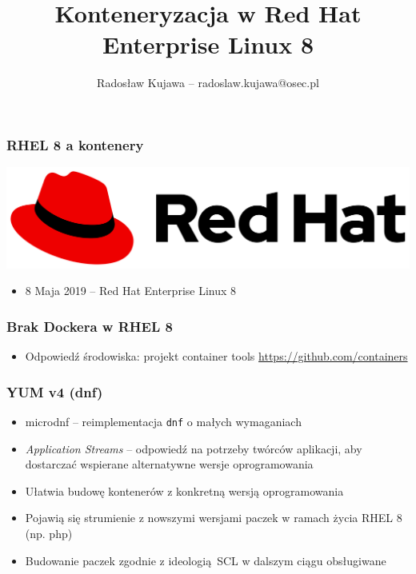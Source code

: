 \documentclass[dvipsnames,table]{beamer}
\title{Konteneryzacja w Red Hat Enterprise Linux 8}
\author{Radosław Kujawa -- radoslaw.kujawa@osec.pl}
\institute{OSEC}
\begin{document}
\begin{frame}
	\titlepage
\end{frame}

\begin{frame}
\frametitle{RHEL 8 a kontenery}
\begin{center}
\includegraphics[scale=0.1]{img-rhlogo.png}
\end{center}
\begin{itemize}
	\item 8 Maja 2019 -- Red Hat Enterprise Linux 8
\end{itemize}
\begin{center}
\end{center}
\end{frame}

\begin{frame}
	\frametitle{Brak Dockera w RHEL 8}
	\begin{itemize}
		\item Odpowiedź środowiska: projekt container tools \url{https://github.com/containers} 
	\end{itemize}
\end{frame}

\begin{frame}
\frametitle{YUM v4 (dnf)}
\begin{itemize}
	\item microdnf -- reimplementacja {\tt dnf} o małych wymaganiach
	\item {\em Application Streams} -- odpowiedź na potrzeby twórców aplikacji, aby dostarczać wspierane alternatywne wersje oprogramowania
	\item Ułatwia budowę kontenerów z konkretną wersją oprogramowania
	\item Pojawią się strumienie z nowszymi wersjami paczek w ramach życia RHEL 8 (np. php)
	\item Budowanie paczek zgodnie z ideologią SCL w dalszym ciągu obsługiwane
\end{itemize}
\begin{center}
\end{center}
\end{frame}
\end{document}
